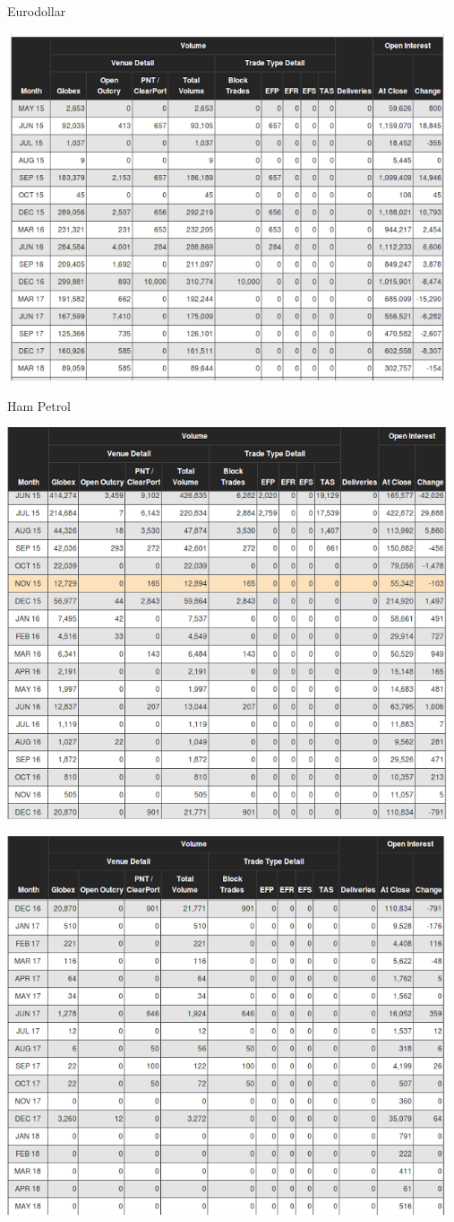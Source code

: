 \documentclass[12pt,fleqn]{article}\usepackage{../../common}
\begin{document}
Eurodollar

\includegraphics[width=13cm]{case_2.png}

Ham Petrol

\includegraphics[width=13cm]{case_3.png}

\includegraphics[width=13cm]{case_3_2.png}
\end{document}

